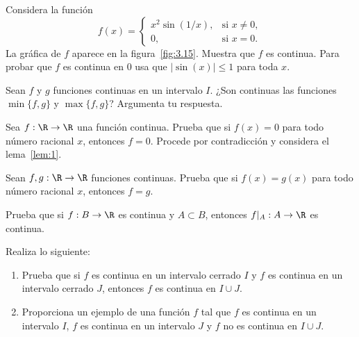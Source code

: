 \documentclass[12pt,a4paper]{book}
\begin{document}
    \begin{ejercicio}\label{ej:198}
        Considera la función
        \begin{equation*}
            f(x)=\begin{cases}
                x^{2}\sin(1/x), & \text{si }x\neq 0,\\
                0, & \text{si }x=0.
            \end{cases}
        \end{equation*}
        La gráfica de $f$ aparece en la figura~\ref{fig:3.15}. Muestra que $f$ es continua. \sugerencia
        Para probar que $f$ es continua en $0$ usa que $|\sin(x)|\leq 1$ para toda
        $x$.
    \end{ejercicio}

    \begin{ejercicio}\label{ej:199}
        Sean $f$ y $g$ funciones continuas en un intervalo $I$. ¿Son
        continuas las funciones $\min\{f,g\}$ y $\max\{f,g\}$? Argumenta tu respuesta.
    \end{ejercicio}

    \begin{ejercicio}\label{ej:200}
        Sea $f:\R\to\R$ una función continua. Prueba que si $f(x)=0$
        para todo número racional $x$, entonces $f=0$. \sugerencia Procede por
        contradicción y considera el lema~\ref{lem:1}.
    \end{ejercicio}

    \begin{ejercicio}\label{ej:201}
        Sean $f,g:\R\to\R$ funciones continuas. Prueba que si $f(x)=
        g(x)$ para todo número racional $x$, entonces $f=g$.
    \end{ejercicio}

    \begin{ejercicio}\label{ej:202}
        Prueba que si $f:B\to\R$ es continua y $A\subset B$, entonces
        $f|_{A}:A\to\R$ es continua.
    \end{ejercicio}

    \begin{ejercicio}\label{ej:203}
        Realiza lo siguiente:
        \begin{enumerate}[nosep]
            \item Prueba que si $f$ es continua en un intervalo cerrado $I$ y $f$ es continua en
            un intervalo cerrado $J$, entonces $f$ es continua en $I\cup J$.
            \item Proporciona un ejemplo de una función $f$ tal que $f$ es continua en un
            intervalo $I$, $f$ es continua en un intervalo $J$ y $f$ no es continua en $I\cup J$.
        \end{enumerate}
    \end{ejercicio}
\end{document}
